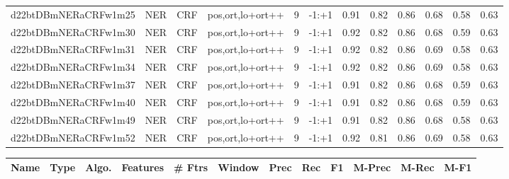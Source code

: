 \documentclass[a4paper]{article}
\begin{document}
\begin{landscape}
\begin{center}
\begin{tabular}{ |c|c|c|c|c|c|c|c|c|c|c|c|}
 
 	
 	\small{ d22btDBmNERaCRFw1m25 } & \small{ NER} & \small{  CRF }  & pos,ort,lo+ort++  &  9 &  \small{  -1:+1 }  &  0.91 & 0.82 & 0.86  &  0.68 & 0.58 & 0.63 \\
 	

 
 	
 	\small{ d22btDBmNERaCRFw1m30 } & \small{ NER} & \small{  CRF }  & pos,ort,lo+ort++  &  9 &  \small{  -1:+1 }  &  0.92 & 0.82 & 0.86  &  0.68 & 0.59 & 0.63 \\
 	

 
 	
 	\small{ d22btDBmNERaCRFw1m31 } & \small{ NER} & \small{  CRF }  & pos,ort,lo+ort++  &  9 &  \small{  -1:+1 }  &  0.92 & 0.82 & 0.86  &  0.69 & 0.58 & 0.63 \\
 	

 
 	
 	\small{ d22btDBmNERaCRFw1m34 } & \small{ NER} & \small{  CRF }  & pos,ort,lo+ort++  &  9 &  \small{  -1:+1 }  &  0.92 & 0.82 & 0.86  &  0.69 & 0.58 & 0.63 \\
 	

 
 	
 	\small{ d22btDBmNERaCRFw1m37 } & \small{ NER} & \small{  CRF }  & pos,ort,lo+ort++  &  9 &  \small{  -1:+1 }  &  0.91 & 0.82 & 0.86  &  0.68 & 0.59 & 0.63 \\
 	

 
 	
 	\small{ d22btDBmNERaCRFw1m40 } & \small{ NER} & \small{  CRF }  & pos,ort,lo+ort++  &  9 &  \small{  -1:+1 }  &  0.91 & 0.82 & 0.86  &  0.68 & 0.59 & 0.63 \\
 	

 
 	
 	\small{ d22btDBmNERaCRFw1m49 } & \small{ NER} & \small{  CRF }  & pos,ort,lo+ort++  &  9 &  \small{  -1:+1 }  &  0.91 & 0.82 & 0.86  &  0.68 & 0.58 & 0.63 \\
 	

 
 	
 	\small{ d22btDBmNERaCRFw1m52 } & \small{ NER} & \small{  CRF }  & pos,ort,lo+ort++  &  9 &  \small{  -1:+1 }  &  0.92 & 0.81 & 0.86  &  0.69 & 0.58 & 0.63 \\
 	
 \hline
\end{tabular}
\end{center}




\begin{center}
\begin{tabular}{ |c|c|c|c|c|c|c|c|c|c|c|c|} 
 \hline
 	Name & Type & Algo. & Features & \# Ftrs & Window & Prec & Rec & F1 & M-Prec & M-Rec & M-F1\\
 \hline


\end{tabular}
\end{center}
\end{landscape}
\end{document}
